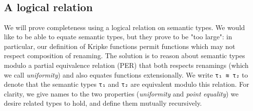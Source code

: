 \documentclass[authoryear, acmsmall, screen, review, nonacm]{acmart}
\begin{document}
\begin{code} %
\>[0]\AgdaSpace{}%
\AgdaSymbol{:}\AgdaSpace{}%
\AgdaSpace{}%
\AgdaSymbol{(}\AgdaSpace{}%
\AgdaSymbol{:}\AgdaSpace{}%
\AgdaSpace{}%
\AgdaSpace{}%
\AgdaSymbol{)}\AgdaSpace{}%
\AgdaSpace{}%
\AgdaSymbol{(}\AgdaSpace{}%
\AgdaSymbol{(}\AgdaSpace{}%
\AgdaSymbol{(}\AgdaSpace{}%
\AgdaSymbol{(}\AgdaSpace{}%
\AgdaSymbol{))))}\AgdaSpace{}%
\AgdaSpace{}%
\AgdaSpace{}%
\AgdaSymbol{(}\AgdaSpace{}%
\AgdaSymbol{)}\<%
\\
\>[0]\AgdaSpace{}%
\AgdaSpace{}%
\AgdaSpace{}%
\AgdaSpace{}%
\AgdaSymbol{(}\AgdaSpace{}%
\AgdaSymbol{)}\AgdaSpace{}%
\AgdaSymbol{=}\AgdaSpace{}%
\<%
\\
%
\\[\AgdaEmptyExtraSkip]%
\>[0]\AgdaSpace{}%
\AgdaSymbol{:}\AgdaSpace{}%
\AgdaSpace{}%
\AgdaSymbol{(}\AgdaSpace{}%
\AgdaSymbol{:}\AgdaSpace{}%
\AgdaSpace{}%
\AgdaSpace{}%
\AgdaSymbol{)}\AgdaSpace{}%
\AgdaSpace{}%
\AgdaFunction{∃[}\AgdaSpace{}%
\AgdaSpace{}%
\AgdaFunction{]}\AgdaSpace{}%
\AgdaSymbol{(}\AgdaSpace{}%
\AgdaSpace{}%
\AgdaSpace{}%
\AgdaSymbol{)}\<%
\\
\>[0]\AgdaSpace{}%
\AgdaSpace{}%
\AgdaSymbol{=}\AgdaSpace{}%
\AgdaSymbol{(}\AgdaSpace{}%
\AgdaSpace{}%
\AgdaSpace{}%
\AgdaOperator{\AgdaInductiveConstructor{,}}\AgdaSpace{}%
\AgdaSpace{}%
\AgdaSpace{}%
\AgdaSymbol{)}\<%
\end{code}


\subsection{A logical relation}
We will prove completeness using a logical relation on semantic types. We would like to be able to equate semantic types, but they prove to be "too large": in particular, our definition of Kripke functions permit functions which may not respect composition of renaming. The solution is to reason about semantic types modulo a partial equivalence relation (PER) that both respects renamings (which we call \emph{uniformity}) and also equates functions extensionally. We write \verb!τ₁ ≋ τ₂! to denote that the semantic types \verb!τ₁! and \verb!τ₂! are equivalent modulo this relation. For clarity, we give names to the two properties (\emph{uniformity} and \emph{point equality}) we desire related types to hold, and define them mutually recursively.
\end{document}
